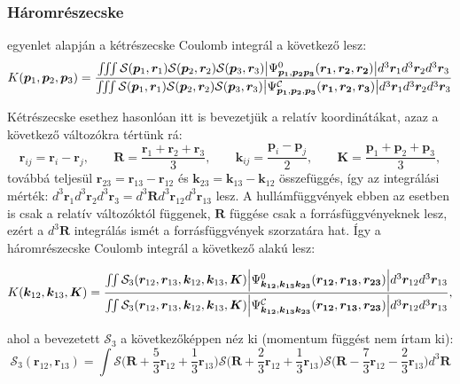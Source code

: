 \documentclass[11pt,a4paper]{article}
\numberwithin{equation}{subsection}
\numberwithin{figure}{section}
\begin{document}
\subsubsection{Háromrészecske}
 egyenlet alapján a kétrészecske Coulomb integrál a következő lesz:
\begin{equation}
K(\bm{p}_1,\bm{p}_2,\bm{p}_3)=
\frac{
\iiint 
\mathcal{S}(\bm{p}_1, \bm{r}_1)\mathcal{S}(\bm{p}_2, \bm{r}_2)\mathcal{S}(\bm{p}_3, \bm{r}_3)
\abs{\Psi^{0}_{\bm{p_1},\bm{p_2}\bm{p_3}}(\bm{r_1},\bm{r_2},\bm{r_2})} d^3 \bm{r}_1d^3 \bm{r}_2d^3 \bm{r}_3
}{\iiint
\mathcal{S}(\bm{p}_1, \bm{r}_1)\mathcal{S}(\bm{p}_2, \bm{r}_2)\mathcal{S}(\bm{p}_3, \bm{r}_3)
\abs{\Psi^\mathcal{C}_{\bm{p_1},\bm{p_2},\bm{p_3}}(\bm{r_1},\bm{r_2},\bm{r_3})}d^3 \bm{r}_1d^3 \bm{r}_2d^3 \bm{r}_3}
\label{eq:Kn3}
\end{equation}

Kétrészecske esethez hasonlóan itt is bevezetjük a relatív koordinátákat, azaz a következő változókra tértünk rá:
\begin{equation}
\bm{r}_{ij} = \bm{r}_i-\bm{r}_j,\;\;\;\;\;\;\;
\bm{R}=\frac{\bm{r}_1+\bm{r}_2+\bm{r}_3}{3},\;\;\;\;\;\;\;
\bm{k}_{ij}=\frac{\bm{p}_{i}-\bm{p}_{j}}{2},\;\;\;\;\;\;\;
\bm{K} = \frac{\bm{p}_1+\bm{p}_2+\bm{p}_3}{3},
\label{eq:CMF3}
\end{equation}
továbbá teljesül $\bm{r}_{23}=\bm{r}_{13}-\bm{r}_{12}$ és $\bm{k}_{23}=\bm{k}_{13}-\bm{k}_{12}$ összefüggés, így az integrálási mérték: $d^3 \bm{r}_1d^3 \bm{r}_2d^3 \bm{r}_3=d^3\bm{R} d^3\bm{r}_{12} d^3\bm{r}_{13}$ lesz. A hullámfüggvények ebben az esetben is csak a relatív változóktól függenek, $\bm{R}$ függése csak a forrásfüggvényeknek lesz, ezért a $d^3\bm{R}$ integrálás ismét a forrásfüggvények szorzatára hat. Így a háromrészecske Coulomb integrál a következő alakú lesz:

\begin{equation}
K(\bm{k}_{12},\bm{k}_{13},\bm{K})=
\frac{
\iint
\mathcal{S}_{3}(\bm{r}_{12}, \bm{r}_{13}, \bm{k}_{12}, \bm{k}_{13}, \bm{K})
\abs{\Psi^{0}_{\bm{k_{12}},\bm{k_{13}}\bm{k_{23}}}(\bm{r_{12}},\bm{r_{13}},\bm{r_{23}})} d^3 \bm{r}_{12}d^3 \bm{r}_{13}
}{\iint
\mathcal{S}_{3}(\bm{r}_{12}, \bm{r}_{13}, \bm{k}_{12}, \bm{k}_{13}, \bm{K})
\abs{\Psi^{\mathcal{C}}_{\bm{k_{12}},\bm{k_{13}}\bm{k_{23}}}(\bm{r_{12}},\bm{r_{13}},\bm{r_{23}})} d^3 \bm{r}_{12}d^3 \bm{r}_{13}},
\label{eq:K3}
\end{equation}

ahol a bevezetett $\mathcal{S}_3$ a következőképpen néz ki (momentum függést nem írtam ki):
\begin{equation}
\mathcal{S}_{3}(\bm{r}_{12}, \bm{r}_{13}) =
\int 
\mathcal{S}\bigg(\bm{R}+\frac{5}{3}\bm{r}_{12}+\frac{1}{3}\bm{r}_{13}\bigg)
\mathcal{S}\bigg(\bm{R}+\frac{2}{3}\bm{r}_{12}+\frac{1}{3}\bm{r}_{13}\bigg)
\mathcal{S}\bigg(\bm{R}-\frac{7}{3}\bm{r}_{12}-\frac{2}{3}\bm{r}_{13}\bigg)
d^3\bm{R}
\end{equation}
\end{document}
